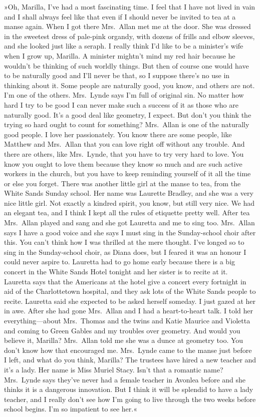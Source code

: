 »Oh, Marilla, I've had a most fascinating time. I feel that I have not lived in vain and I shall always feel like that even if I should never be invited to tea at a manse again. When I got there Mrs.~Allan met me at the door. She was dressed in the sweetest dress of pale-pink organdy, with dozens of frills and elbow sleeves, and she looked just like a seraph. I really think I'd like to be a minister's wife when I grow up, Marilla. A minister mightn't mind my red hair because he wouldn't be thinking of such worldly things. But then of course one would have to be naturally good and I'll never be that, so I suppose there's no use in thinking about it. Some people are naturally good, you know, and others are not. I'm one of the others. Mrs.~Lynde says I'm full of original sin. No matter how hard I try to be good I can never make such a success of it as those who are naturally good. It's a good deal like geometry, I expect. But don't you think the trying so hard ought to count for something? Mrs.~Allan is one of the naturally good people. I love her passionately. You know there are some people, like Matthew and Mrs.~Allan that you can love right off without any trouble. And there are others, like Mrs.~Lynde, that you have to try very hard to love. You know you ought to love them because they know so much and are such active workers in the church, but you have to keep reminding yourself of it all the time or else you forget. There was another little girl at the manse to tea, from the White Sands Sunday school. Her name was Laurette Bradley, and she was a very nice little girl. Not exactly a kindred spirit, you know, but still very nice. We had an elegant tea, and I think I kept all the rules of etiquette pretty well. After tea Mrs.~Allan played and sang and she got Lauretta and me to sing too. Mrs.~Allan says I have a good voice and she says I must sing in the Sunday-school choir after this. You can't think how I was thrilled at the mere thought. I've longed so to sing in the Sunday-school choir, as Diana does, but I feared it was an honour I could never aspire to. Lauretta had to go home early because there is a big concert in the White Sands Hotel tonight and her sister is to recite at it. Lauretta says that the Americans at the hotel give a concert every fortnight in aid of the Charlottetown hospital, and they ask lots of the White Sands people to recite. Lauretta said she expected to be asked herself someday. I just gazed at her in awe. After she had gone Mrs.~Allan and I had a heart-to-heart talk. I told her everything—about Mrs.~Thomas and the twins and Katie Maurice and Violetta and coming to Green Gables and my troubles over geometry. And would you believe it, Marilla? Mrs.~Allan told me she was a dunce at geometry too. You don't know how that encouraged me. Mrs.~Lynde came to the manse just before I left, and what do you think, Marilla? The trustees have hired a new teacher and it's a lady. Her name is Miss Muriel Stacy. Isn't that a romantic name? Mrs.~Lynde says they've never had a female teacher in Avonlea before and she thinks it is a dangerous innovation. But I think it will be splendid to have a lady teacher, and I really don't see how I'm going to live through the two weeks before school begins. I'm so impatient to see her.«